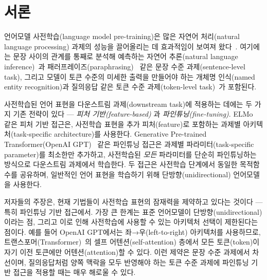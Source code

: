 \section{서론}


언어모델 사전학습(language model pre-training)은 많은 자연어 처리(natural language processing) 과제의 성능을 끌어올리는 데 효과적임이 보여져 왔다~\cite{dai-le:2015:_semi, peters-etal:2018:_deep, radford-etal:2018, howard-ruder:2018}. 여기에는 문장 사이의 관계를 통째로 분석해 예측하는 자연어 추론(natural language inference)~\cite{bowman-etal:2015, williams-nangia-bowman:2018}과 패러프레이즈(paraphrasing)~\cite{dolan-brockett:2005:_autom} 같은 문장 수준 과제(sentence-level task), 그리고 모델이 토큰 수준의 미세한 출력을 만들어야 하는 개체명 인식(named entity recognition)과 질의응답 같은 토큰 수준 과제(token-level task)~\cite{tjong-de:2003, rajpurkar-etal:2016:_squad}가 포함된다.


사전학습된 언어 표현을 다운스트림 과제(downstream task)에 적용하는 데에는 두 가지 기존 전략이 있다 — \emph{피처 기반(feature-based)} 과 \emph{파인튜닝(fine-tuning)}. ELMo~\cite{peters-etal:2018:_deep} 같은 피처 기반 접근은, 사전학습 표현을 추가 피처(feature)로 포함하는 과제별 아키텍처(task-specific architecture)를 사용한다. Generative Pre-trained Transformer(OpenAI GPT)~\cite{radford-etal:2018} 같은 파인튜닝 접근은 과제별 파라미터(task-specific parameter)를 최소한만 추가하고, 사전학습된 \emph{모든} 파라미터를 단순히 파인튜닝하는 방식으로 다운스트림 과제에서 학습한다. 두 접근은 사전학습 단계에서 동일한 목적함수를 공유하며, 일반적인 언어 표현을 학습하기 위해 단방향(unidirectional) 언어모델을 사용한다.

저자들의 주장은, 현재 기법들이 사전학습 표현의 잠재력을 제약하고 있다는 것이다 — 특히 파인튜닝 기반 접근에서. 가장 큰 한계는 표준 언어모델이 단방향(unidirectional)이라는 점, 그리고 이로 인해 사전학습에 사용할 수 있는 아키텍처 선택이 제한된다는 점이다. 예를 들어 OpenAI GPT에서는 좌→우(left-to-right) 아키텍처를 사용하므로, 트랜스포머(Transformer)~\cite{vaswani-etal:2017:_atten}의 셀프 어텐션(self-attention) 층에서 모든 토큰(token)이 자기 이전 토큰에만 어텐션(attention)할 수 있다. 이런 제약은 문장 수준 과제에서 차선이며, 질의응답처럼 양쪽 맥락을 모두 반영해야 하는 토큰 수준 과제에 파인튜닝 기반 접근을 적용할 때는 매우 해로울 수 있다.

